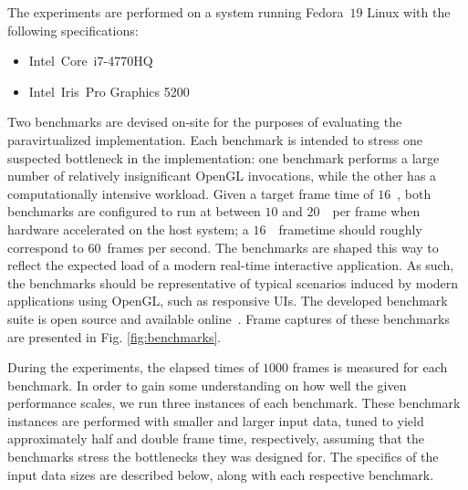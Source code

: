 The experiments are performed on a system running Fedora~$19$ Linux with the following specifications:
\begin{itemize}
\item Intel\circledR\ Core\texttrademark\ i7-4770HQ
\item Intel\circledR\ Iris\texttrademark\ Pro Graphics 5200
\end{itemize}

Two benchmarks are devised on-site for the purposes of evaluating the paravirtualized implementation.
Each benchmark is intended to stress one suspected bottleneck in the implementation: one benchmark performs a large number of relatively insignificant OpenGL invocations, while the other has a computationally intensive workload.
Given a target frame time of $16$~\milli\second , both benchmarks are configured to run at between $10$ and $20$~\milli\second\ per frame when hardware accelerated on the host system; a $16$~\milli\second\ frametime should roughly correspond to $60$~frames per second.
The benchmarks are shaped this way to reflect the expected load of a modern real-time interactive application.
As such, the benchmarks should be representative of typical scenarios induced by modern applications using OpenGL, such as responsive UIs.
The developed benchmark suite is open source and available online~.
Frame captures of these benchmarks are presented in Fig. \ref{fig:benchmarks}.

During the experiments, the elapsed times of $1000$ frames is measured for each benchmark.
In order to gain some understanding on how well the given performance scales, we run three instances of each benchmark.
These benchmark instances are performed with smaller and larger input data, tuned to yield approximately half and double frame time, respectively, assuming that the benchmarks stress the bottlenecks they was designed for.
The specifics of the input data sizes are described below, along with each respective benchmark.

